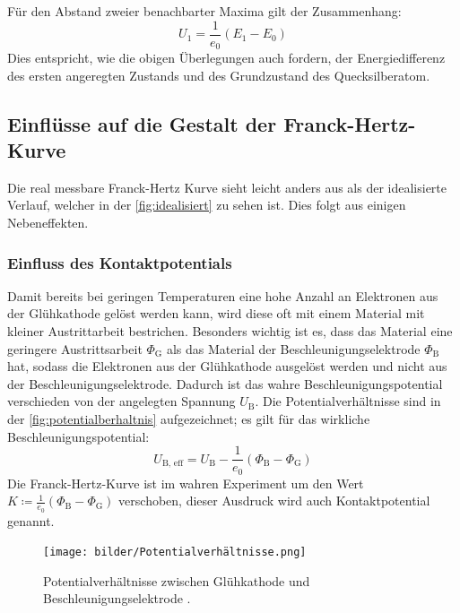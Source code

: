     \noindent Für den Abstand zweier benachbarter Maxima gilt der Zusammenhang:
    \begin{equation*}
        U_1 = \frac{1}{e_0} \left( E_1 - E_0 \right)
    \end{equation*}
    Dies entspricht, wie die obigen Überlegungen auch fordern, der Energiedifferenz des ersten angeregten Zustands und des Grundzustand des Quecksilberatom. 

\subsection{Einflüsse auf die Gestalt der Franck-Hertz-Kurve}

    Die real messbare Franck-Hertz Kurve sieht leicht anders aus als der idealisierte Verlauf, welcher in der \autoref{fig:idealisiert} zu sehen ist. 
    Dies folgt aus einigen Nebeneffekten. 

    \subsubsection{Einfluss des Kontaktpotentials}

        Damit bereits bei geringen Temperaturen eine hohe Anzahl an Elektronen aus der Glühkathode gelöst werden kann, wird diese oft mit einem Material mit 
        kleiner Austrittarbeit bestrichen. Besonders wichtig ist es, dass das Material eine geringere Austrittsarbeit $\Phi_{\text{G}}$ als das Material der Beschleunigungselektrode $\Phi_{\text{B}}$ 
        hat, sodass die Elektronen aus der Glühkathode ausgelöst werden und nicht aus der Beschleunigungselektrode. Dadurch ist das wahre Beschleunigungspotential 
        verschieden von der angelegten Spannung $U_{\text{B}}$. Die Potentialverhältnisse sind in der \autoref{fig:potentialberhaltnis} aufgezeichnet; 
        es gilt für das wirkliche Beschleunigungspotential:
        \begin{equation*}
            U_{\text{B, eff}} = U_{\text{B}} - \frac{1}{e_0} \left( \Phi_{\text{B}} - \Phi_{\text{G}} \right)
        \end{equation*}
        Die Franck-Hertz-Kurve ist im wahren Experiment um den Wert $K \coloneq \frac{1}{e_0} \left( \Phi_{\text{B}} - \Phi_{\text{G}} \right)$ verschoben, dieser 
        Ausdruck wird auch Kontaktpotential genannt. 

        \begin{figure}[H]
            \centering 
            \texttt{[image: bilder/Potentialverhältnisse.png]}
            \caption{Potentialverhältnisse zwischen Glühkathode und Beschleunigungselektrode \cite{anleitung}.}
            \label{fig:potentialberhaltnis}
        \end{figure}


